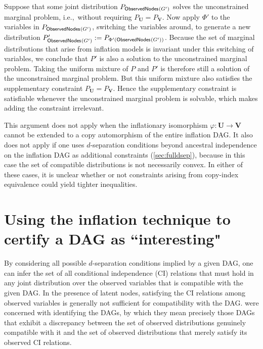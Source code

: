 \documentclass[aps,english,superscriptaddress,onecolumn,twoside,longbibliography,pra,floatfix,fleqn,nofootinbib]{revtex4-1}%
\newcommand*{\tblue}[1]{{\color{MidnightBlue}{\textbf{#1}}}}
\theoremstyle{definition}
\newcommand{\SmallNamedFunction}[3][]{\operatorname{\mathsf{#2}}_{#1}\parenths{#3}}
\newcommand{\obsnodes}[1]{\SmallNamedFunction{ObservedNodes}{#1}}
\DeclarePairedDelimiter{\parenths}{\lparen}{\rparen}
\begin{document}
Suppose that some joint distribution $P_{\obsnodes{G'}}$ solves the unconstrained marginal problem, i.e.,~without requiring $P_{\bm{U}} = P_{\bm{V}}$. Now apply $\Phi'$ to the variables in $P_{\obsnodes{G'}}$, switching the variables around, to generate a new distribution $P'_{\obsnodes{G'}}:=P_{\Phi'(\obsnodes{G'})}$. Because the set of marginal distributions that arise from inflation models is invariant under this switching of variables, we conclude that $P'$ is also a solution to the unconstrained marginal problem. Taking the uniform mixture of $P$ and $P'$ is therefore still a solution of the unconstrained marginal problem. But this uniform mixture also satisfies the supplementary constraint $P_{\bm{U}} = P_{\bm{V}}$. Hence the supplementary constraint is satisfiable whenever the unconstrained marginal problem is solvable, which makes adding the constraint irrelevant.

This argument does not apply when the inflationary isomorphism $\varphi:\bm{U}\to\bm{V}$ cannot be extended to a copy automorphism of the entire inflation DAG. It also does not apply if one uses $d$-separation conditions beyond ancestral independence on the inflation DAG as additional constraints (\cref{sec:fulldsep}), because in this case the set of compatible distributions is not necessarily convex.  In either of these cases, it is unclear whether or not constraints arising from copy-index equivalence could yield tighter inequalities. 



\section{Using the inflation technique to certify a DAG as ``interesting"\label{sec:interestingproof}}

By considering all possible $d$-separation conditions implied by a given DAG, one can infer the set of all conditional independence (CI) relations that must hold in any joint distribution over the observed variables that is compatible with the given DAG. In the presence of latent nodes, satisfying the CI relations among observed variables 
is generally not sufficient for compatibility with the DAG. \citet{pusey2014gdag} were concerned with identifying the \tblue{interesting} DAGs, by which they mean precisely those DAGs that exhibit a discrepancy between the set of observed distributions genuinely compatible with it and the set of observed distributions that merely satisfy its observed CI relations.
\end{document}

